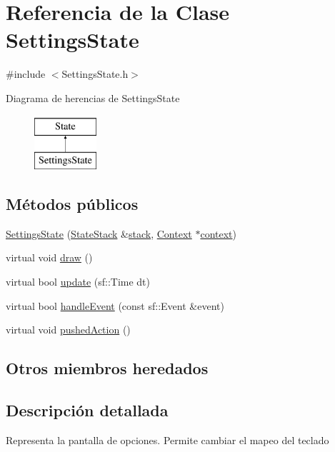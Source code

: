 \hypertarget{classSettingsState}{}\section{Referencia de la Clase Settings\+State}
\label{classSettingsState}


{\ttfamily \#include $<$Settings\+State.\+h$>$}

Diagrama de herencias de Settings\+State\begin{figure}[H]
\begin{center}
\leavevmode
\includegraphics[height=2.000000cm]{classSettingsState}
\end{center}
\end{figure}
\subsection*{Métodos públicos}
\begin{DoxyCompactItemize}
\item 
\hyperlink{classSettingsState_a67ad7173de1a0fa00d8746fc88fdb2b5}{Settings\+State} (\hyperlink{classStateStack}{State\+Stack} \&\hyperlink{classState_a86c8d3a5a1ee89896828be85a785fb04}{stack}, \hyperlink{classContext}{Context} $\ast$\hyperlink{classState_adc93e8ad3199b5891618ca88eed0436a}{context})
\item 
virtual void \hyperlink{classSettingsState_afb948fe782ad303939a3833030898d5c}{draw} ()
\item 
virtual bool \hyperlink{classSettingsState_a8b93195e2c3d037cbf4b61add04081c2}{update} (sf\+::\+Time dt)
\item 
virtual bool \hyperlink{classSettingsState_a21fddce7003c26dd485154df18261be5}{handle\+Event} (const sf\+::\+Event \&event)
\item 
virtual void \hyperlink{classSettingsState_a0815b26acaac5860b227c9d641842c88}{pushed\+Action} ()
\end{DoxyCompactItemize}
\subsection*{Otros miembros heredados}


\subsection{Descripción detallada}
Representa la pantalla de opciones. Permite cambiar el mapeo del teclado 


